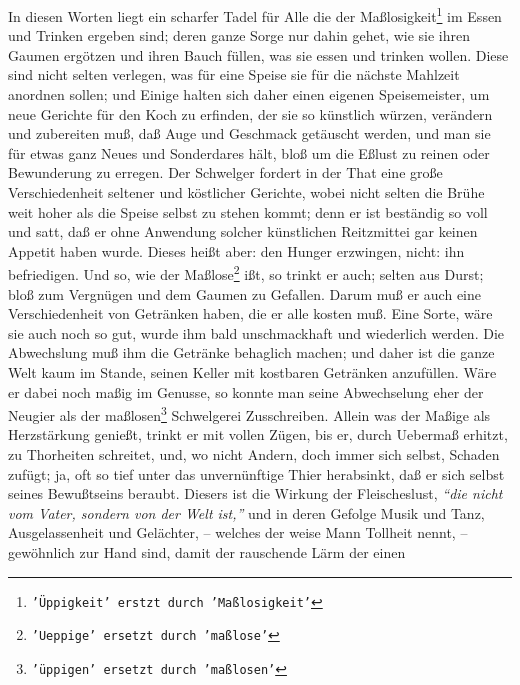 \medskip

In diesen Worten liegt ein scharfer Tadel für Alle die der Maßlosigkeit\footnote{\texttt{'Üppigkeit' erstzt durch 'Maßlosigkeit'}} im Essen
und Trinken ergeben sind; deren ganze Sorge nur dahin gehet, wie sie ihren
Gaumen ergötzen und ihren Bauch füllen, was sie essen und trinken wollen. Diese
sind nicht selten verlegen, was für eine Speise sie für die nächste Mahlzeit
anordnen sollen; und Einige halten sich daher einen eigenen Speisemeister, um
neue Gerichte für den Koch zu erfinden, der sie so künstlich würzen, verändern
und zubereiten muß, daß Auge und Geschmack getäuscht werden, und man sie für
etwas ganz Neues und Sonderdares hält, bloß um die Eßlust zu reinen oder
Bewunderung zu erregen. Der Schwelger fordert in der That eine große
Verschiedenheit seltener und köstlicher Gerichte, wobei nicht selten die Brühe
weit hoher als die Speise selbst zu stehen kommt; denn er ist beständig so voll
und satt, daß er ohne Anwendung solcher künstlichen Reitzmittei gar keinen
Appetit haben wurde. Dieses heißt aber: den Hunger erzwingen, nicht: ihn
befriedigen. Und so, wie der Maßlose\footnote{\texttt{'Ueppige' ersetzt durch 'maßlose'}} ißt, so trinkt er auch; selten aus Durst;
bloß zum Vergnügen und dem Gaumen zu Gefallen. Darum muß er auch eine
Verschiedenheit von Getränken haben, die er alle kosten muß. Eine Sorte, wäre
sie auch noch so gut, wurde ihm bald unschmackhaft und wiederlich werden. Die
Abwechslung muß ihm die Getränke behaglich machen; und daher ist die ganze Welt
kaum im Stande, seinen Keller mit kostbaren Getränken anzufüllen. Wäre er dabei
noch maßig im Genusse, so konnte man seine Abwechselung eher der Neugier als der
maßlosen\footnote{\texttt{'üppigen' ersetzt durch 'maßlosen'}} Schwelgerei Zusschreiben. Allein was der Maßige als Herzstärkung
genießt, trinkt er mit vollen Zügen, bis er, durch Uebermaß erhitzt, zu
Thorheiten schreitet, und, wo nicht Andern, doch immer sich selbst, Schaden
zufügt; ja, oft so tief unter das unvernünftige Thier herabsinkt, daß er sich
selbst seines Bewußtseins beraubt. Diesers ist die Wirkung der Fleischeslust,
\textit{"`die nicht vom Vater, sondern von der Welt ist,"'} und in deren Gefolge Musik und Tanz, Ausgelassenheit und Gelächter, -- welches der weise Mann Tollheit
nennt, -- gewöhnlich zur Hand sind, damit der rauschende Lärm der einen
